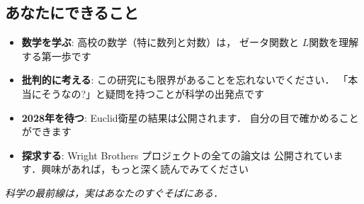 \documentclass[11pt,a4paper]{article}
\begin{document}
\subsection{あなたにできること}

\begin{itemize}
\item \textbf{数学を学ぶ}: 高校の数学（特に数列と対数）は，
ゼータ関数と $L$関数を理解する第一歩です

\item \textbf{批判的に考える}: この研究にも限界があることを忘れないでください．
「本当にそうなの?」と疑問を持つことが科学の出発点です

\item \textbf{2028年を待つ}: Euclid衛星の結果は公開されます．
自分の目で確かめることができます

\item \textbf{探求する}: Wright Brothers プロジェクトの全ての論文は
公開されています．興味があれば，もっと深く読んでみてください
\end{itemize}

\vspace{1em}

\begin{center}
\textit{科学の最前線は，実はあなたのすぐそばにある．}
\end{center}
\end{document}
